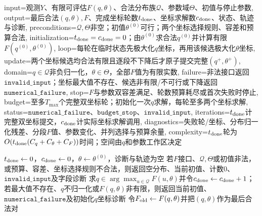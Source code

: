 \begin{AlgorithmContract}{
  input={观测$Y$、有限可评估$F(q,\theta)$、合法分布族$\mathcal Q$、参数域$\Theta$、初值与停止参数},
  output={最后合法$(q,\theta),F$、完成坐标轮数$t_{\rm done}$、坐标求解数$c_{\rm done}$、状态、轨迹与诊断},
  preconditions={$\mathcal Q,\Theta$非空；初值$\theta^{(0)}$可行；两个坐标选择规则、容差和预算合法},
  initialization={$t_{\rm done}=c_{\rm done}=0$；由$\theta^{(0)}$求合法$q^{(0)}$并计算有限$F(q^{(0)},\theta^{(0)})$},
  loop={每轮在临时状态先极大化$q$坐标，再用该候选极大化$\theta$坐标},
  update={两个坐标候选均合法有限且逐段不下降后才原子提交完整$(q^+,\theta^+)$},
  domain={$q\in\mathcal Q$非负归一化，$\theta\in\Theta$，全部$F$值为有限实数},
  failure={非法接口返回$\mathtt{invalid\_input}$；坐标最大值不存在、候选非有限/不可行或下降返回$\mathtt{numerical\_failure}$},
  stop={$F$与参数双容差满足、轮数预算耗尽或首次失败时停止},
  budget={至多$T_{\max}$个完整双坐标轮；初始化一次$q$求解，每轮至多两个坐标求解},
  status={$\mathtt{numerical\_failure}$、$\mathtt{budget\_stop}$、$\mathtt{invalid\_input}$},
  iterations={$t_{\rm done}$计完整双坐标提交，$c_{\rm done}$计实际坐标求解调用},
  diagnostics={失败轮/坐标、分布归一化残差、分段$F$值、参数变化、并列选择与预算余量},
  complexity={$t_{\rm done}$轮为$O(t_{\rm done}(C_q+C_\theta+C_F))$时间；空间由$q$和参数工作区决定}
}
\begin{algorithm}[H]
\caption{基于$F$函数的交替极大化}\label{alg:V3-C04-gem-f}
$t_{\rm done}\leftarrow0$，$c_{\rm done}\leftarrow0$，$\theta\leftarrow\theta^{(0)}$，诊断与轨迹为空\;
若$F$接口、$\mathcal Q,\Theta$或初值非法，或预算、容差、坐标选择规则不合法，则返回空分布、当前初值、计数$0$、$\mathtt{invalid\_input}$及字段诊断\;
求$q\in\arg\max_{u\in\mathcal Q}F(u,\theta)$并令$c_{\rm done}\leftarrow c_{\rm done}+1$；若最大值不存在、$q$不归一化或$F(q,\theta)$非有限，则返回当前初值、$\mathtt{numerical\_failure}$及初始化$q$坐标诊断\;
令$F_{\rm old}\leftarrow F(q,\theta)$并把$(q,\theta)$作为最后合法对\;
\end{algorithm}
\end{AlgorithmContract}

